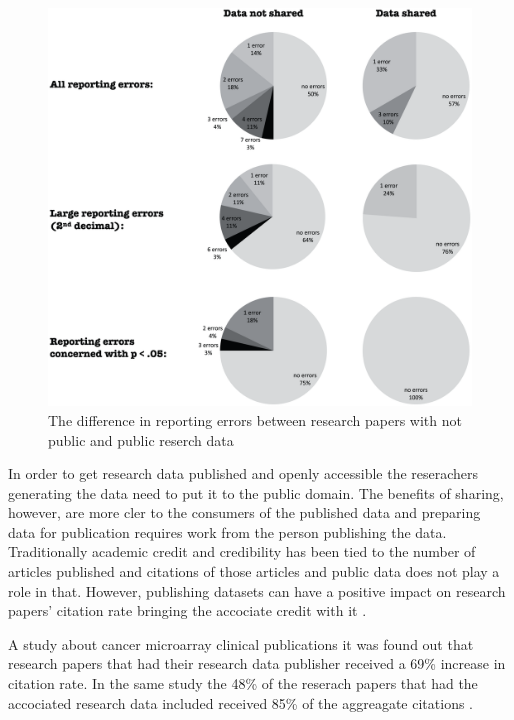 \begin{figure}
    \begin{centering}
        \includegraphics[width=\textwidth]{images/reporting_errors}
    \end{centering}
    \caption{The difference in reporting errors between research papers with not public and public reserch data \cite{wicherts2011willingness}}
    \label{fig:errors}
\end{figure}

In order to get research data published and openly accessible the reserachers
generating the data need to put it to the public domain. The benefits of
sharing, however, are more cler to the consumers of the published data and
preparing data for publication requires work from the person publishing the
data. Traditionally academic credit and credibility has been tied to the number
of articles published and citations of those articles and public data does not
play a role in that. However, publishing datasets can have a positive impact on
research papers' citation rate bringing the accociate credit with it
\cite{piwowar2007sharing}.

A study about cancer microarray clinical publications it was found out that
research papers that had their research data publisher received a 69\%
increase in citation rate. In the same study the 48\% of the reserach papers
that had the accociated research data included received 85\% of the aggreagate
citations \cite{piwowar2007sharing}.

